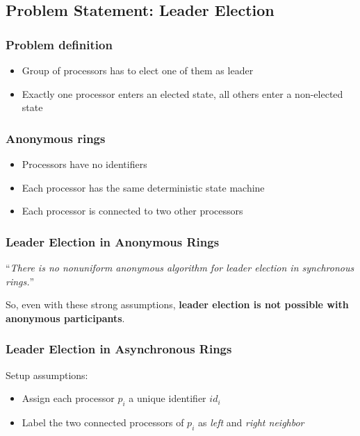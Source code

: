 \documentclass[12pt,A4]{extarticle}
\begin{document}
\subsection{Problem Statement: Leader Election}
\subsubsection{Problem definition}
\begin{itemize}
  \item{Group of processors has to elect one of them as leader}
  \item{Exactly one processor enters an elected state, all others enter a non-elected state}
\end{itemize}

\subsubsection{Anonymous rings}
\begin{itemize}
  \item{Processors have no identifiers}
  \item{Each processor has the same deterministic state machine}
  \item{Each processor is connected to two other processors}
\end{itemize}

\subsubsection{Leader Election in Anonymous Rings}
``\textit{There is no nonuniform anonymous algorithm for leader election in synchronous rings.}''\par
So, even with these strong assumptions, \textbf{leader election is not possible with anonymous participants}.

\subsubsection{Leader Election in Asynchronous Rings}
Setup assumptions:
\begin{itemize}
  \item{Assign each processor $p_i$ a unique identifier $id_i$}
  \item{Label the two connected processors of $p_i$ as \textit{left} and \textit{right neighbor}}
\end{itemize}
\end{document}
